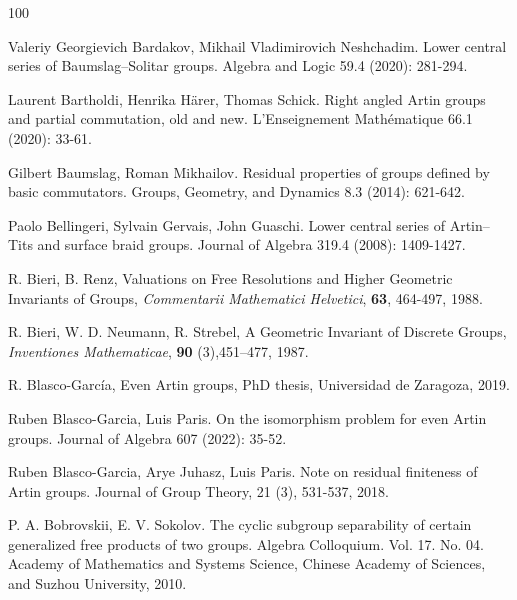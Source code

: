 \documentclass[10pt, oneside]{amsart}
\theoremstyle{definition}
\theoremstyle{remark}
\theoremstyle{plain}
\begin{document}
\begin{thebibliography}{100}

 Valeriy Georgievich Bardakov, Mikhail Vladimirovich Neshchadim. Lower central series of Baumslag–Solitar groups. Algebra and Logic 59.4 (2020): 281-294.

 Laurent Bartholdi, Henrika Härer, Thomas Schick. Right angled Artin groups and partial commutation, old and new. L’Enseignement Mathématique 66.1 (2020): 33-61.



 Gilbert Baumslag, Roman Mikhailov. Residual properties of groups defined by basic commutators. Groups, Geometry, and Dynamics 8.3 (2014): 621-642.

 Paolo Bellingeri, Sylvain Gervais, John Guaschi. Lower central series of Artin–Tits and surface braid groups. Journal of Algebra 319.4 (2008): 1409-1427.

 R. Bieri, B. Renz, Valuations on Free Resolutions and Higher Geometric Invariants of Groups, \textit{Commentarii Mathematici Helvetici}, \textbf{63}, 464-497, 1988.

 R. Bieri, W. D. Neumann, R. Strebel, A Geometric Invariant of Discrete Groups, \textit{Inventiones Mathematicae}, \textbf{90} (3),451–477, 1987.

	R. Blasco-García, Even Artin groups, PhD thesis, Universidad de Zaragoza, 2019.

 Ruben Blasco-Garcia, Luis Paris. On the isomorphism problem for even Artin groups. Journal of Algebra 607 (2022): 35-52.

 Ruben Blasco-Garcia, Arye Juhasz, Luis Paris. Note on residual finiteness of Artin groups. Journal of Group Theory, 21 (3), 531-537, 2018.

 P. A. Bobrovskii, E. V. Sokolov. The cyclic subgroup separability of certain generalized free products of two groups. Algebra Colloquium. Vol. 17. No. 04. Academy of Mathematics and Systems Science, Chinese Academy of Sciences, and Suzhou University, 2010.


\end{thebibliography}
\end{document}
